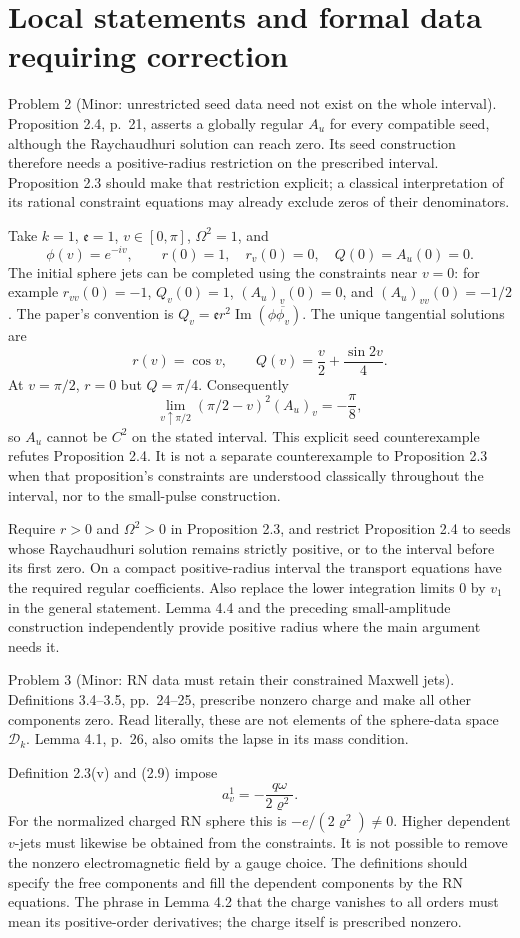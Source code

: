 \documentclass[10pt]{article}
\begin{document}
\section*{Local statements and formal data requiring correction}
Problem 2 (Minor: unrestricted seed data need not exist on the whole interval).  Proposition 2.4, p. 21, asserts a globally regular \(A_u\) for every compatible seed, although the Raychaudhuri solution can reach zero. Its seed construction therefore needs a positive-radius restriction on the prescribed interval. Proposition 2.3 should make that restriction explicit; a classical interpretation of its rational constraint equations may already exclude zeros of their denominators.\par
Take \(k=1\), \(\mathfrak e=1\), \(v\in[0,\pi]\), \(\Omega^2=1\), and \[\phi(v)=e^{-iv},\qquad
 r(0)=1,\quad r_v(0)=0,\quad Q(0)=A_u(0)=0.\] The initial sphere jets can be completed using the constraints near \(v=0\): for example \(r_{vv}(0)=-1\), \(Q_v(0)=1\), \((A_u)_v(0)=0\), and \((A_u)_{vv}(0)=-1/2\). The paper’s convention is \(Q_v=\mathfrak er^2\operatorname{Im}(\phi\overline{\phi_v})\). The unique tangential solutions are \[r(v)=\cos v,\qquad Q(v)=\frac v2+\frac{\sin2v}{4}.\] At \(v=\pi/2\), \(r=0\) but \(Q=\pi/4\). Consequently \[\lim_{v\uparrow\pi/2}(\pi/2-v)^2(A_u)_v=-\frac{\pi}{8},\] so \(A_u\) cannot be \(C^2\) on the stated interval. This explicit seed counterexample refutes Proposition 2.4. It is not a separate counterexample to Proposition 2.3 when that proposition’s constraints are understood classically throughout the interval, nor to the small-pulse construction.\par
Require \(r>0\) and \(\Omega^2>0\) in Proposition 2.3, and restrict Proposition 2.4 to seeds whose Raychaudhuri solution remains strictly positive, or to the interval before its first zero. On a compact positive-radius interval the transport equations have the required regular coefficients. Also replace the lower integration limits \(0\) by \(v_1\) in the general statement. Lemma 4.4 and the preceding small-amplitude construction independently provide positive radius where the main argument needs it.\par
Problem 3 (Minor: RN data must retain their constrained Maxwell jets).  Definitions 3.4–3.5, pp. 24–25, prescribe nonzero charge and make all other components zero. Read literally, these are not elements of the sphere-data space \(\mathcal D_k\). Lemma 4.1, p. 26, also omits the lapse in its mass condition.\par
Definition 2.3(v) and (2.9) impose \[a_v^1=-\frac{q\omega}{2\varrho^2}.\] For the normalized charged RN sphere this is \(-e/(2\varrho^2)\ne0\). Higher dependent \(v\)-jets must likewise be obtained from the constraints. It is not possible to remove the nonzero electromagnetic field by a gauge choice. The definitions should specify the free components and fill the dependent components by the RN equations. The phrase in Lemma 4.2 that the charge vanishes to all orders must mean its positive-order derivatives; the charge itself is prescribed nonzero.\par
\end{document}
